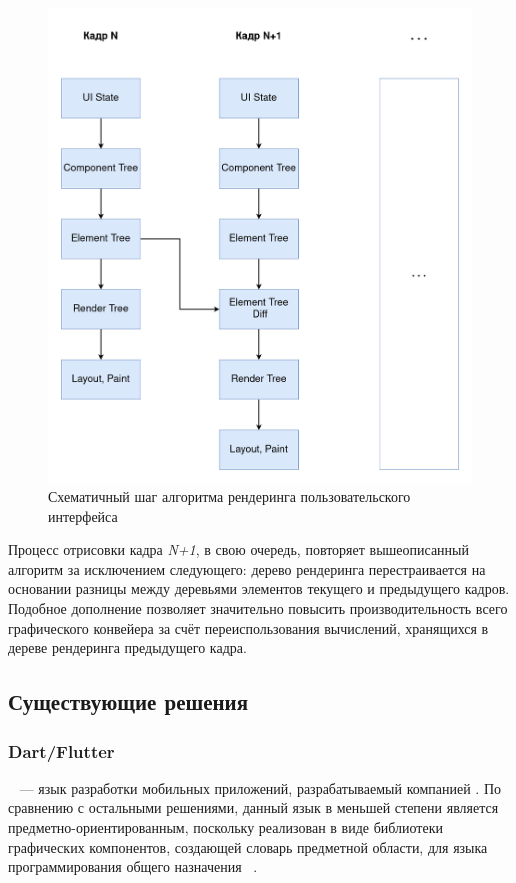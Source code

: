\begin{figure}[h]
\centering
\includegraphics[width=\linewidth,height=0.9\linewidth,keepaspectratio]{resources/ui-render-pipeline.png}
\caption{Схематичный шаг алгоритма рендеринга пользовательского интерфейса}
\label{render-pipeline}
\end{figure}

Процесс отрисовки кадра \textit{N+1}, в свою очередь, повторяет
вышеописанный алгоритм за исключением следующего: дерево рендеринга
перестраивается на основании разницы между деревьями элементов текущего и
предыдущего кадров.
Подобное дополнение позволяет значительно повысить производительность
всего графического конвейера за счёт переиспользования вычислений,
хранящихся в дереве рендеринга предыдущего кадра.



\subsection{Существующие решения}
\subsubsection*{Dart/Flutter}
~\cite{flutter-homepage} --- язык разработки
мобильных приложений, разрабатываемый компанией . По
сравнению с остальными решениями, данный язык в меньшей степени является
предметно-ориентированным, поскольку реализован в виде библиотеки
графических компонентов, создающей словарь предметной области, для языка
программирования общего назначения ~\cite{dart-homepage}.

